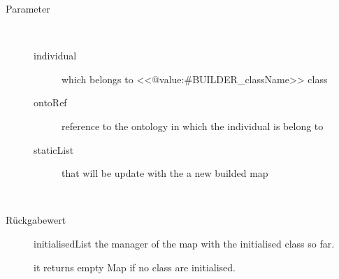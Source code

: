\begin{description}
\begin{description}
\item[Parameter] ~
\begin{description}
\item[individual]
which belongs to <<@value:#BUILDER\_className>> class
\item[ontoRef]
reference to the ontology in which the individual is belong to
\item[staticList]
that will be update with the a new builded map
\end{description}
\end{description}
\item[{\ltdHypertarget{ontologyFramework.OFRunning.OFInitialising.OFInitialiser.getInitialisedList()}{getInitialisedList}\label{ontologyFramework.OFRunning.OFInitialising.OFInitialiser.getInitialisedList()}}]
~ 
\begin{description}
\item[Rückgabewert] 
initialisedList the manager of the map with the initialised class so far.
 
 it returns empty Map if no class are initialised.
\end{description}
\end{description}
